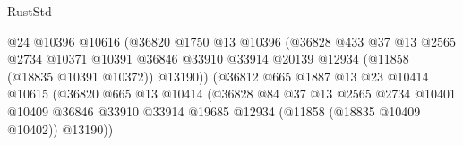 \begin{lexlean}{RustStd}
\begin{coremodule}
                                            @24
                                            @10396
                                            @10616
                                            (@36820
                                              @1750
                                              @13
                                              @10396
                                              (@36828
                                                @433
                                                @37
                                                @13
                                                @2565
                                                @2734
                                                @10371
                                                @10391
                                                @36846
                                                @33910
                                                @33914
                                                @20139
                                                @12934
                                                (@11858 (@18835 @10391 @10372))
                                                @13190))
                                            (@36812
                                              @665
                                              @1887
                                              @13
                                              @23
                                              @10414
                                              @10615
                                              (@36820
                                                @665
                                                @13
                                                @10414
                                                (@36828
                                                  @84
                                                  @37
                                                  @13
                                                  @2565
                                                  @2734
                                                  @10401
                                                  @10409
                                                  @36846
                                                  @33910
                                                  @33914
                                                  @19685
                                                  @12934
                                                  (@11858 (@18835 @10409 @10402))
                                                  @13190))

\end{coremodule}
\end{lexlean}
